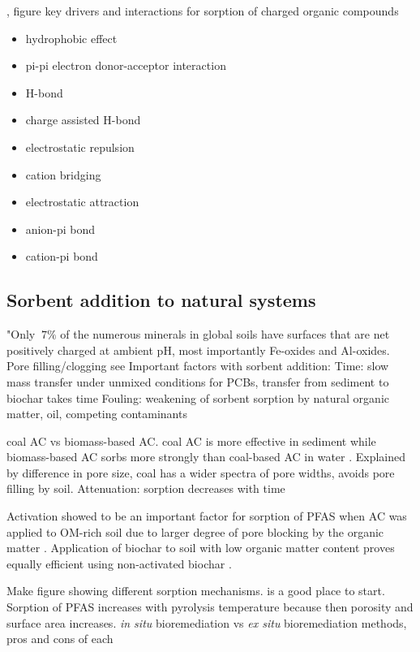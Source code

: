 \citep{sigmund2022sorption}, figure key drivers and interactions for sorption of charged organic compounds
\begin{itemize}
    \item hydrophobic effect
    \item pi-pi electron donor-acceptor interaction
    \item H-bond
    \item charge assisted H-bond
    \item electrostatic repulsion
    \item cation bridging
    \item electrostatic attraction
    \item anion-pi bond
    \item cation-pi bond
\end{itemize}

\subsection{Sorbent addition to natural systems}
"Only $~7\%$ of the numerous minerals in global soils have surfaces that are net positively charged at ambient pH, most importantly Fe-oxides and Al-oxides. 
Pore filling/clogging see \citep{Li2019}
Important factors with sorbent addition:
Time: slow mass transfer under unmixed conditions for PCBs, transfer from sediment to biochar takes time \citep{Werner2006}
Fouling: weakening of sorbent sorption by natural organic matter, oil, competing contaminants

coal AC vs biomass-based AC. coal AC is more effective in sediment while biomass-based AC sorbs more strongly than coal-based AC in water \citep{amstaetter2012}. Explained by difference in pore size, coal has a wider spectra of pore widths, avoids pore filling by soil. 
Attenuation: sorption decreases with time

Activation showed to be an important factor for sorption of PFAS when AC was applied to OM-rich soil due to larger degree of pore blocking by the organic matter \citep{Sormo2021}. Application of biochar to soil with low organic matter content proves equally efficient using non-activated biochar \citep{Alhashimi2017}. 

Make figure showing different sorption mechanisms.\citep{Li2019} is a good place to start. Sorption of PFAS increases with pyrolysis temperature because then porosity and surface area increases.  \textit{in situ} bioremediation vs \textit{ex situ} bioremediation methods, pros and cons of each








